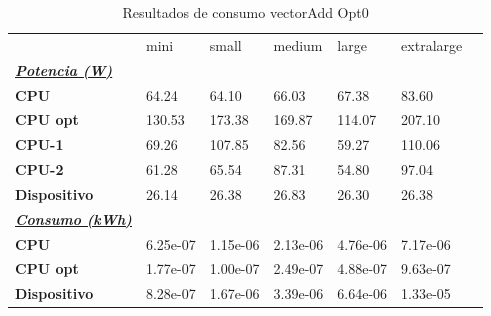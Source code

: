 \begin{table}[H]
    \centering
    \begin{tabular}{lllllll}
    \rowcolor[HTML]{DAE8FC} \ & mini & small & medium & 	large & 	extralarge \\
    \cellcolor[HTML]{DAE8FC} \textbf{\textbf{{\emph{{\underline{{Potencia (W)}}}}}}} &  &  &  & 	 & 	 \\
    \rowcolor[HTML]{EFEFEF} \cellcolor[HTML]{DAE8FC} \textbf{CPU} & 64.24 & 64.10 & 66.03 & 	67.38 & 	83.60 \\
    \cellcolor[HTML]{DAE8FC} \textbf{CPU opt} & 130.53 & 173.38 & 169.87 & 	114.07 & 	207.10 \\
    \rowcolor[HTML]{EFEFEF} \cellcolor[HTML]{DAE8FC} \textbf{\quad CPU-1} & 69.26 & 107.85 & 82.56 & 	59.27 & 	110.06 \\
    \cellcolor[HTML]{DAE8FC} \textbf{\quad CPU-2} & 61.28 & 65.54 & 87.31 & 	54.80 & 	97.04 \\
    \rowcolor[HTML]{EFEFEF} \cellcolor[HTML]{DAE8FC} \textbf{Dispositivo} & 26.14 & 26.38 & 26.83 & 	26.30 & 	26.38 \\
    \cellcolor[HTML]{DAE8FC} \textbf{\textbf{{\emph{{\underline{{Consumo (kWh)}}}}}}} &  &  &  & 	 & 	 \\
    \rowcolor[HTML]{EFEFEF} \cellcolor[HTML]{DAE8FC} \textbf{CPU} & 6.25e-07 & 1.15e-06 & 2.13e-06 & 	4.76e-06 & 	7.17e-06 \\
    \cellcolor[HTML]{DAE8FC} \textbf{CPU opt} & 1.77e-07 & 1.00e-07 & 2.49e-07 & 	4.88e-07 & 	9.63e-07 \\
    \rowcolor[HTML]{EFEFEF} \cellcolor[HTML]{DAE8FC} \textbf{Dispositivo} & 8.28e-07 & 1.67e-06 & 3.39e-06 & 	6.64e-06 & 	1.33e-05 \\
    \end{tabular}
    \caption[Resultados de consumo vectorAdd Opt0]{{Resultados de consumo vectorAdd Opt0}}
    \label{table_test_vectorAdd_Opt0_hw_powerResults}
\end{table}